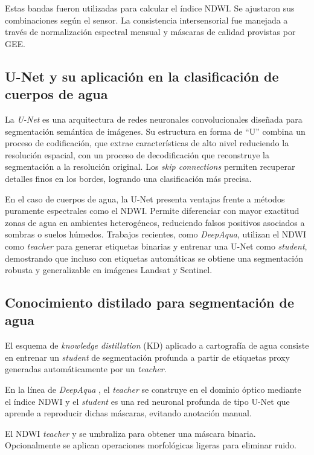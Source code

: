Estas bandas fueron utilizadas para calcular el índice NDWI. Se ajustaron sus combinaciones según el sensor. La consistencia intersensorial fue manejada a través de normalización espectral mensual y máscaras de calidad provistas por GEE.


\subsection{U-Net y su aplicación en la clasificación de cuerpos de agua}

La \textit{U-Net} es una arquitectura de redes neuronales convolucionales diseñada para
segmentación semántica de imágenes. Su estructura en forma de ``U'' combina un
proceso de codificación, que extrae características de alto nivel reduciendo la
resolución espacial, con un proceso de decodificación que reconstruye la
segmentación a la resolución original. Los \textit{skip connections} permiten
recuperar detalles finos en los bordes, logrando una clasificación más precisa.

En el caso de cuerpos de agua, la U-Net presenta ventajas frente a métodos
puramente espectrales como el NDWI. Permite diferenciar con mayor exactitud
zonas de agua en ambientes heterogéneos, reduciendo falsos positivos asociados
a sombras o suelos húmedos. Trabajos recientes, como \textit{DeepAqua}\cite{DeepAqua2023},
utilizan el NDWI como \textit{teacher} para generar etiquetas binarias y entrenar
una U-Net como \textit{student}, demostrando que incluso con etiquetas automáticas
se obtiene una segmentación robusta y generalizable en imágenes Landsat y Sentinel.


\subsection{Conocimiento distilado para segmentación de agua}

El esquema de \textit{knowledge distillation} (KD) aplicado a cartografía de agua consiste en entrenar un \textit{student} de segmentación profunda a partir de etiquetas proxy generadas automáticamente por un \textit{teacher}. 

En la línea de \emph{DeepAqua} \cite{DeepAqua2023}, el \textit{teacher} se construye en el dominio óptico mediante el índice NDWI y el \textit{student} es una red neuronal profunda de tipo U-Net que aprende a reproducir dichas máscaras, evitando anotación manual.

El NDWI \textit{teacher} y se umbraliza para obtener una máscara binaria. Opcionalmente se aplican operaciones morfológicas ligeras para eliminar ruido. 

